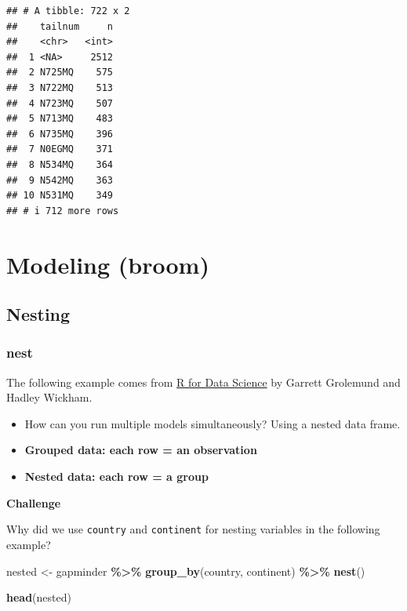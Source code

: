 \documentclass[
]{book}
\newenvironment{Shaded}{\begin{snugshade}}{\end{snugshade}}
\newcommand{\FunctionTok}[1]{\textcolor[rgb]{0.13,0.29,0.53}{\textbf{#1}}}
\newcommand{\NormalTok}[1]{#1}
\newcommand{\OtherTok}[1]{\textcolor[rgb]{0.56,0.35,0.01}{#1}}
\newcommand{\SpecialCharTok}[1]{\textcolor[rgb]{0.81,0.36,0.00}{\textbf{#1}}}
\providecommand{\tightlist}{%
  \setlength{\itemsep}{0pt}\setlength{\parskip}{0pt}}
\begin{document}
\begin{verbatim}
## # A tibble: 722 x 2
##    tailnum     n
##    <chr>   <int>
##  1 <NA>     2512
##  2 N725MQ    575
##  3 N722MQ    513
##  4 N723MQ    507
##  5 N713MQ    483
##  6 N735MQ    396
##  7 N0EGMQ    371
##  8 N534MQ    364
##  9 N542MQ    363
## 10 N531MQ    349
## # i 712 more rows
\end{verbatim}

\section{Modeling (broom)}\label{modeling-broom}

\subsection{Nesting}\label{nesting}

\subsubsection{nest}\label{nest}

The following example comes from \href{https://r4ds.had.co.nz/many-models.html}{R for Data Science} by Garrett Grolemund and Hadley Wickham.

\begin{itemize}
\tightlist
\item
  How can you run multiple models simultaneously? Using a nested data frame.
\end{itemize}

\begin{itemize}
\item
  \textbf{Grouped data: each row = an observation}
\item
  \textbf{Nested data: each row = a group}
\end{itemize}

\textbf{Challenge}

Why did we use \texttt{country} and \texttt{continent} for nesting variables in the following example?

\begin{Shaded}
\begin{Highlighting}[]
\NormalTok{nested }\OtherTok{\textless{}{-}}\NormalTok{ gapminder }\SpecialCharTok{\%\textgreater{}\%}
  \FunctionTok{group\_by}\NormalTok{(country, continent) }\SpecialCharTok{\%\textgreater{}\%}
  \FunctionTok{nest}\NormalTok{()}

\FunctionTok{head}\NormalTok{(nested)}
\end{Highlighting}
\end{Shaded}
\end{document}
